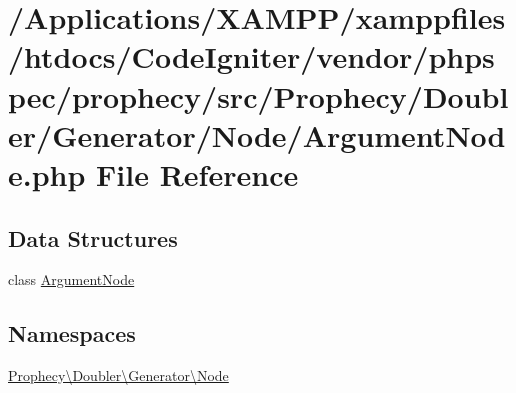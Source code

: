 \hypertarget{_argument_node_8php}{}\section{/\+Applications/\+X\+A\+M\+P\+P/xamppfiles/htdocs/\+Code\+Igniter/vendor/phpspec/prophecy/src/\+Prophecy/\+Doubler/\+Generator/\+Node/\+Argument\+Node.php File Reference}
\label{_argument_node_8php}
\subsection*{Data Structures}
\begin{DoxyCompactItemize}
\item 
class \mbox{\hyperlink{class_prophecy_1_1_doubler_1_1_generator_1_1_node_1_1_argument_node}{Argument\+Node}}
\end{DoxyCompactItemize}
\subsection*{Namespaces}
\begin{DoxyCompactItemize}
\item 
 \mbox{\hyperlink{namespace_prophecy_1_1_doubler_1_1_generator_1_1_node}{Prophecy\textbackslash{}\+Doubler\textbackslash{}\+Generator\textbackslash{}\+Node}}
\end{DoxyCompactItemize}
